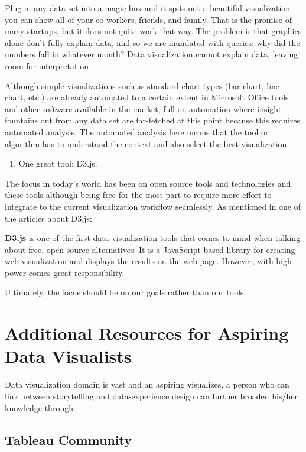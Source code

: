 \documentclass[]{book}
\providecommand{\tightlist}{%
  \setlength{\itemsep}{0pt}\setlength{\parskip}{0pt}}
\theoremstyle{definition}
\theoremstyle{definition}
\theoremstyle{definition}
\theoremstyle{remark}
\begin{document}
Plug in any data set into a magic box and it spits out a beautiful
visualization you can show all of your co-workers, friends, and family.
That is the promise of many startups, but it does not quite work that
way. The problem is that graphics alone don't fully explain data, and so
we are inundated with queries: why did the numbers fall in whatever
month? Data visualization cannot explain data, leaving room for
interpretation.

Although simple visualizations such as standard chart types (bar chart,
line chart, etc.) are already automated to a certain extent in Microsoft
Office tools and other software available in the market, full on
automation where insight fountains out from any data set are far-fetched
at this point because this requires automated analysis. The automated
analysis here means that the tool or algorithm has to understand the
context and also select the best visualization.

\begin{enumerate}
\def\labelenumi{\arabic{enumi}.}
\setcounter{enumi}{5}
\tightlist
\item
  One great tool: D3.js.
\end{enumerate}

The focus in today's world has been on open source tools and
technologies and these tools although being free for the most part to
require more effort to integrate to the current visualization workflow
seamlessly. As mentioned in one of the articles about D3.js:

\textbf{D3.js} is one of the first data visualization tools that comes
to mind when talking about free, open-source alternatives. It is a
JavaScript-based library for creating web visualization and displays the
results on the web page. However, with high power comes great
responsibility.

Ultimately, the focus should be on our goals rather than our tools.

\section{Additional Resources for Aspiring Data
Visualists}\label{additional-resources-for-aspiring-data-visualists}

Data visualization domain is vast and an aspiring visualizes, a person
who can link between storytelling and data-experience design can further
broaden his/her knowledge through:

\subsection{Tableau Community}\label{tableau-community}
\end{document}
